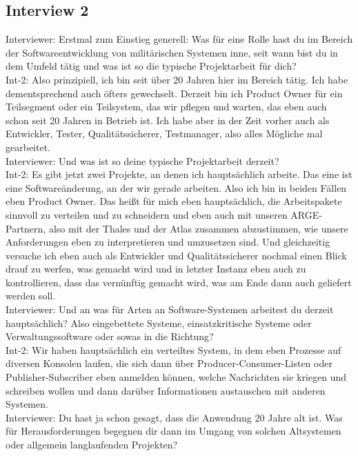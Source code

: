 \subsection*{Interview 2}
Interviewer: Erstmal zum Einstieg generell: Was für eine Rolle hast du im Bereich der Softwareentwicklung von militärischen Systemen inne, seit wann bist du in dem Umfeld tätig und was ist so die typische Projektarbeit für dich?\\
Int-2: Also prinzipiell, ich bin seit über 20 Jahren hier im Bereich tätig. Ich habe dementsprechend auch öfters gewechselt. Derzeit bin ich Product Owner für ein Teilsegment oder ein Teilsystem, das wir pflegen und warten, das eben auch schon seit 20 Jahren in Betrieb ist. Ich habe aber in der Zeit vorher auch als Entwickler, Tester, Qualitätssicherer, Testmanager, also alles Mögliche mal gearbeitet.\\
Interviewer: Und was ist so deine typische Projektarbeit derzeit?\\
Int-2: Es gibt jetzt zwei Projekte, an denen ich hauptsächlich arbeite. Das eine ist eine Softwareänderung, an der wir gerade arbeiten. Also ich bin in beiden Fällen eben Product Owner. Das heißt für mich eben hauptsächlich, die Arbeitspakete sinnvoll zu verteilen und zu schneidern und eben auch mit unseren ARGE-Partnern, also mit der Thales und der Atlas zusammen abzustimmen, wie unsere Anforderungen eben zu interpretieren und umzusetzen sind. Und gleichzeitig versuche ich eben auch als Entwickler und Qualitätssicherer nochmal einen Blick drauf zu werfen, was gemacht wird und in letzter Instanz eben auch zu kontrollieren, dass das vernünftig gemacht wird, was am Ende dann auch geliefert werden soll.\\
Interviewer: Und an was für Arten an Software-Systemen arbeitest du derzeit hauptsächlich? Also eingebettete Systeme, einsatzkritische Systeme oder Verwaltungssoftware oder sowas in die Richtung?\\
Int-2: Wir haben hauptsächlich ein verteiltes System, in dem eben Prozesse auf diversen Konsolen laufen, die sich dann über Producer-Consumer-Listen oder Publisher-Subscriber eben anmelden können, welche Nachrichten sie kriegen und schreiben wollen und dann darüber Informationen austauschen mit anderen Systemen. \\
Interviewer: Du hast ja schon gesagt, dass die Anwendung 20 Jahre alt ist. Was für Herausforderungen begegnen dir dann im Umgang von solchen Altsystemen oder allgemein langlaufenden Projekten?\\
